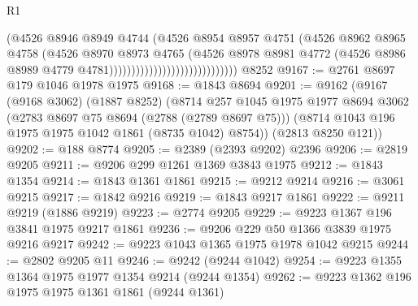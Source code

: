 \begin{lexlean}{R1}
\begin{coremodule}
                                                  (@4526
                                                    @8946
                                                    @8949
                                                    @4744
                                                    (@4526
                                                      @8954
                                                      @8957
                                                      @4751
                                                      (@4526
                                                        @8962
                                                        @8965
                                                        @4758
                                                        (@4526
                                                          @8970
                                                          @8973
                                                          @4765
                                                          (@4526
                                                            @8978
                                                            @8981
                                                            @4772
                                                            (@4526
                                                              @8986
                                                              @8989
                                                              @4779
                                                              @4781)))))))))))))))))))))))))))))
    @8252
@9167 := @2761 @8697 @179 @1046 @1978 @1975
@9168 := @1843 @8694
@9201 := @9162
    (@9167
      (@9168 @3062)
      (@1887 @8252)
      (@8714
        @257
        @1045
        @1975
        @1977
        @8694
        @3062
        (@2783 @8697 @75 @8694 (@2788 (@2789 @8697 @75)))
        (@8714 @1043 @196 @1975 @1975 @1042 @1861 (@8735 @1042) @8754))
      (@2813 @8250 @121))
@9202 := @188 @8774
@9205 := @2389 (@2393 @9202) @2396
@9206 := @2819 @9205
@9211 := @9206 @299 @1261 @1369 @3843 @1975
@9212 := @1843 @1354
@9214 := @1843 @1361 @1861
@9215 := @9212 @9214
@9216 := @3061 @9215
@9217 := @1842 @9216
@9219 := @1843 @9217 @1861
@9222 := @9211 @9219 (@1886 @9219)
@9223 := @2774 @9205
@9229 := @9223 @1367 @196 @3841 @1975 @9217 @1861
@9236 := @9206 @229 @50 @1366 @3839 @1975 @9216 @9217
@9242 := @9223 @1043 @1365 @1975 @1978 @1042 @9215
@9244 := @2802 @9205 @11
@9246 := @9242 (@9244 @1042)
@9254 := @9223 @1355 @1364 @1975 @1977 @1354 @9214 (@9244 @1354)
@9262 := @9223 @1362 @196 @1975 @1975 @1361 @1861 (@9244 @1361)

\end{coremodule}
\end{lexlean}
